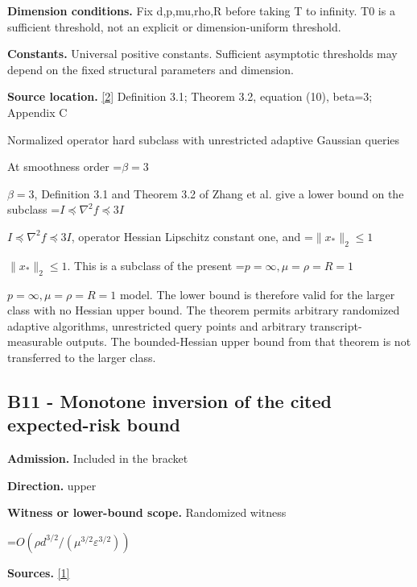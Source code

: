 \documentclass[10pt,a4paper]{article}
\newcommand{\AtlasMath}[1]{\par\begingroup\centering\setbox0=\hbox{$\displaystyle #1$}\ifdim\wd0>1.4\linewidth\typeout{ATLAS WIDE FORMULA: \the\wd0}\fi\ifdim\wd0>\linewidth\resizebox{\linewidth}{!}{\box0}\else\box0\fi\par\endgroup}
\newcommand{\AtlasInlineMath}[1]{\begingroup\setbox0=\hbox{$#1$}\ifdim\wd0>.4\linewidth\endgroup\AtlasMath{#1}\else\endgroup$#1$\fi}
\begin{document}
\textbf{Dimension conditions.} Fix d,p,mu,rho,R before taking T to infinity. T0 is a sufficient threshold, not an explicit or dimension-uniform threshold.



\textbf{Constants.} Universal positive constants. Sufficient asymptotic thresholds may depend on the fixed structural parameters and dimension.



\textbf{Source location.} \href{https://arxiv.org/html/2610.00276v2}{[2]} Definition 3.1; Theorem 3.2, equation (10), beta=3; Appendix C



Normalized operator hard subclass with unrestricted adaptive Gaussian queries



At smoothness order \AtlasInlineMath{\beta=3}, Definition 3.1 and Theorem 3.2 of Zhang et al. give a lower bound on the subclass \AtlasInlineMath{I\preceq\nabla^2 f\preceq3I}, operator Hessian Lipschitz constant one, and \AtlasInlineMath{\|x_*\|_2\le1}. This is a subclass of the present \AtlasInlineMath{p=\infty,\mu=\rho=R=1} model. The lower bound is therefore valid for the larger class with no Hessian upper bound. The theorem permits arbitrary randomized adaptive algorithms, unrestricted query points and arbitrary transcript-measurable outputs. The bounded-Hessian upper bound from that theorem is not transferred to the larger class.



\subsection{B11 - Monotone inversion of the cited expected-risk bound}


\textbf{Admission.} Included in the bracket



\textbf{Direction.} upper



\textbf{Witness or lower-bound scope.} Randomized witness



\AtlasMath{O(\rho d^{3/2}/(\mu^{3/2}\varepsilon^{3/2}))}


\textbf{Sources.} \href{https://papers.nips.cc/paper_files/paper/2024/file/b444ad72520a5f5c467343be88e352ed-Paper-Conference.pdf}{[1]}
\end{document}
